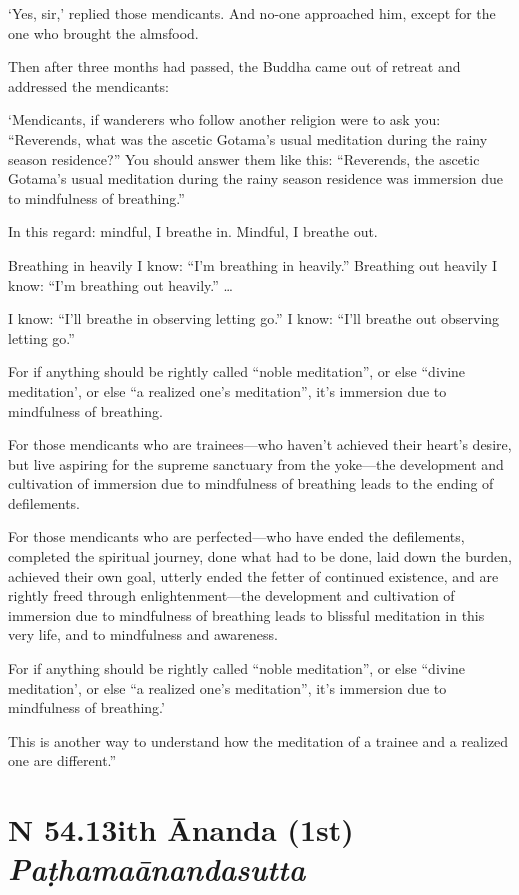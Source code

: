 \documentclass[12pt,openany]{book}%
\newcommand*{\suttatitleacronym}[1]{\smaller[2]{#1}\vspace*{.3em}}
\newcommand*{\suttatitletranslation}[1]{\linebreak{#1}}
\newcommand*{\suttatitleroot}[1]{\linebreak\smaller[2]\itshape{#1}}
\newcommand*{\tocacronym}[1]{\hspace*{-3.3em}{#1}\quad}
\newcommand*{\toctranslation}[1]{#1}
\newcommand*{\tocroot}[1]{(\textit{#1})}
\begin{document}
‘Yes, sir,’ replied those mendicants. And no-one approached him, except for the one who brought the almsfood. 

Then after three months had passed, the Buddha came out of retreat and addressed the mendicants: 

‘Mendicants, if wanderers who follow another religion were to ask you: “Reverends, what was the ascetic Gotama’s usual meditation during the rainy season residence?” You should answer them like this: “Reverends, the ascetic Gotama’s usual meditation during the rainy season residence was immersion due to mindfulness of breathing.” 

In this regard: mindful, I breathe in. Mindful, I breathe out. 

Breathing in heavily I know: “I’m breathing in heavily.” Breathing out heavily I know: “I’m breathing out heavily.” … 

I know: “I’ll breathe in observing letting go.” I know: “I’ll breathe out observing letting go.” 

For if anything should be rightly called “noble meditation”, or else “divine meditation’, or else “a realized one’s meditation”, it’s immersion due to mindfulness of breathing. 

For those mendicants who are trainees—who haven’t achieved their heart’s desire, but live aspiring for the supreme sanctuary from the yoke—the development and cultivation of immersion due to mindfulness of breathing leads to the ending of defilements. 

For those mendicants who are perfected—who have ended the defilements, completed the spiritual journey, done what had to be done, laid down the burden, achieved their own goal, utterly ended the fetter of continued existence, and are rightly freed through enlightenment—the development and cultivation of immersion due to mindfulness of breathing leads to blissful meditation in this very life, and to mindfulness and awareness. 

For if anything should be rightly called “noble meditation”, or else “divine meditation’, or else “a realized one’s meditation”, it’s immersion due to mindfulness of breathing.’ 

This is another way to understand how the meditation of a trainee and a realized one are different.” 

%
\section*{{\suttatitleacronym SN 54.13}{\suttatitletranslation With Ānanda (1st) }{\suttatitleroot Paṭhamaānandasutta}}
\addcontentsline{toc}{section}{\tocacronym{SN 54.13} \toctranslation{With Ānanda (1st) } \tocroot{Paṭhamaānandasutta}}
\end{document}
